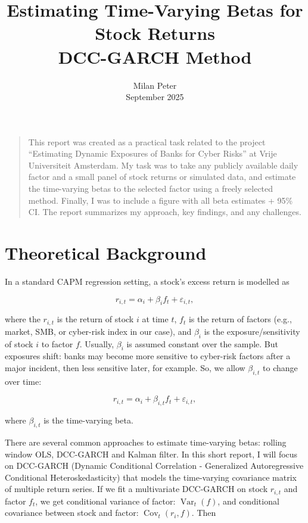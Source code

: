 \documentclass[10pt,parskip=half]{scrartcl}
\title{	
	\normalfont\normalsize
	\vspace{-15pt}
	{\huge Estimating Time-Varying Betas for Stock Returns}\\ %
	\vspace{10pt} %
	{\huge DCC-GARCH Method}\\ %
	\vspace{0pt} %
}
\author{
    \LARGE Milan Peter \\
    \large September 2025 \\
}
\date{}
\numberwithin{equation}{section} %
\numberwithin{figure}{section}   %
\numberwithin{table}{section}    %
\begin{document}
\maketitle %
\vspace{-3.5em}  %

\begin{quote}
This report was created as a practical task related to the project ``Estimating Dynamic Exposures of Banks for Cyber Risks'' at Vrije Universiteit Amsterdam.
My task was to take any publicly available daily factor and a small panel of stock returns or simulated data, and estimate the time-varying betas to the selected factor using a freely selected method.
Finally, I was to include a figure with all beta estimates + 95\% CI.
The report summarizes my approach, key findings, and any challenges.
\end{quote}

\section{Theoretical Background}
\vspace{-1em}
In a standard CAPM regression setting, a stock's excess return is modelled as

\[
r_{i,t} = \alpha_i + \beta_i f_t + \varepsilon_{i,t}, \tag{1}
\]

where the \(r_{i,t}\) is the return of stock \(i\) at time \(t\), \(f_t\) is the return of factors (e.g., market, SMB, or cyber-risk index in our case), and \(\beta_i\) is the exposure/sensitivity of stock \(i\) to factor \(f\).
Usually, \(\beta_i\) is assumed constant over the sample.
But exposures shift: banks may become more sensitive to cyber-risk factors after a major incident, then less sensitive later, for example. So, we allow \(\beta_{i,t}\) to change over time:

\[
r_{i,t} = \alpha_i + \beta_{i,t} f_t + \varepsilon_{i,t}, \tag{2}
\]

where \(\beta_{i,t}\) is the time-varying beta.

There are several common approaches to estimate time-varying betas: rolling window OLS, DCC-GARCH and Kalman filter.
In this short report, I will focus on DCC-GARCH (Dynamic Conditional Correlation - Generalized Autoregressive Conditional Heteroskedasticity) that models the time-varying covariance matrix of multiple return series.
If we fit a multivariate DCC-GARCH on stock \(r_{i,t}\) and factor \(f_t\), we get conditional variance of factor: \(\operatorname{Var}_t(f)\), and conditional covariance between stock and factor: \(\operatorname{Cov}_t(r_i,f)\). Then
\end{document}
